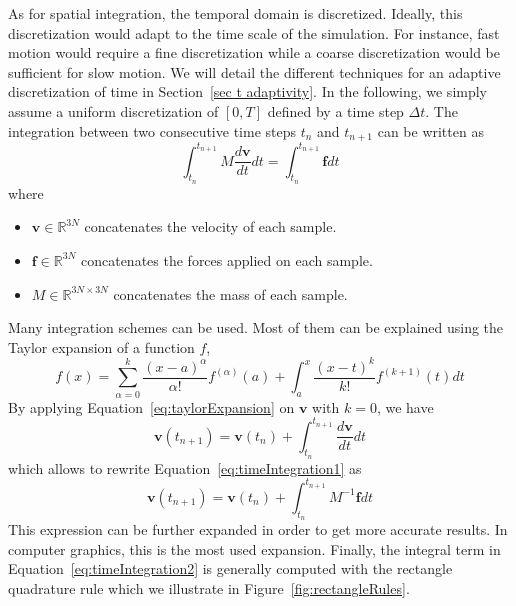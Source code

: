 As for spatial integration, the temporal domain is discretized. Ideally, this discretization would adapt to the time scale of the simulation. For instance, fast motion would require a fine discretization while a coarse discretization would be sufficient for slow motion. We will detail the different techniques for an adaptive discretization of time in Section~\ref{sec t adaptivity}.
In the following, we simply assume a uniform discretization of $\left[0,T\right]$ defined by a time step $\Delta t$. The integration between two consecutive time steps $t_{n}$ and $t_{n+1}$ can be written as
\begin{equation}
\label{eq:timeIntegration1}
\displaystyle
\int_{t_{n}}^{t_{n+1}}
M \frac{d\mathbf{v}}{dt} dt
=
\int_{t_{n}}^{t_{n+1}}\mathbf{f} dt
\end{equation}
where
\begin{itemize}
	\item $\mathbf{v} \in \mathbb{R}^{3N}$ concatenates the velocity of each sample.
	\item $\mathbf{f} \in \mathbb{R}^{3N}$ concatenates the forces applied on each sample.
	\item $M \in \mathbb{R}^{3N \times 3N}$ concatenates the mass of each sample.
\end{itemize}
Many integration schemes can be used. Most of them can be explained using the Taylor expansion of a function $f$,
\begin{equation}
\label{eq:taylorExpansion}
\displaystyle
f(x) = \sum_{\alpha=0}^{k}\frac{\left(x-a\right)^{\alpha}}{\alpha!}f^{(\alpha)}(a) + \int_{a}^{x}\frac{\left(x-t\right)^{k}}{k!}f^{(k+1)}(t)dt
\end{equation}
By applying Equation~\eqref{eq:taylorExpansion} on $\mathbf{v}$ with $k=0$, we have
\begin{equation}
\mathbf{v}(t_{n+1}) = \mathbf{v}(t_{n}) + \int_{t_{n}}^{t_{n+1}} \frac{d\mathbf{v}}{dt}dt
\end{equation}
which allows to rewrite Equation~\eqref{eq:timeIntegration1} as
\begin{equation}
\label{eq:timeIntegration2}
\mathbf{v}(t_{n+1}) = \mathbf{v}(t_{n}) + \int_{t_{n}}^{t_{n+1}} M^{-1}\mathbf{f}dt
\end{equation}
This expression can be further expanded in order to get more accurate results. In computer graphics, this is the most used expansion. Finally, the integral term in Equation~\eqref{eq:timeIntegration2} is generally computed with the rectangle quadrature rule which we illustrate in Figure~\ref{fig:rectangleRules}.
